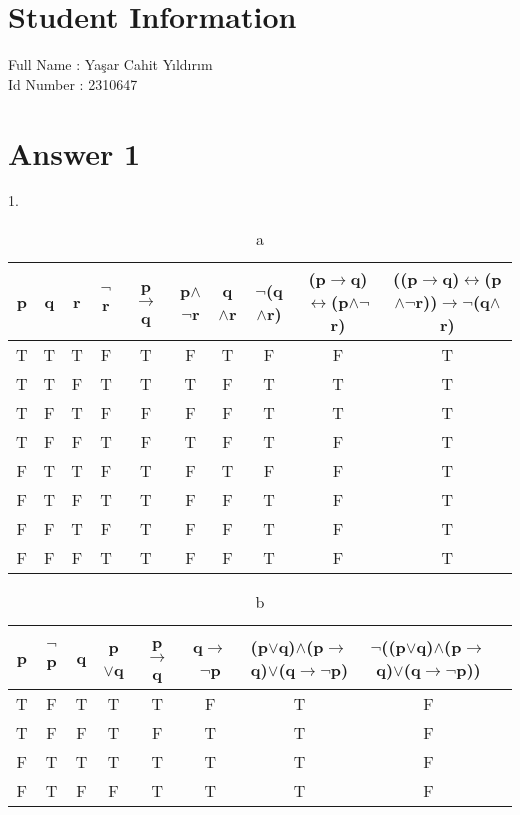 \documentclass[12pt]{article}
\begin{document}
\section*{Student Information } 
Full Name : Yaşar Cahit Yıldırım \\
Id Number : 2310647

\section*{Answer 1}
1.
\begin{table}[H]
\small
\centering
\caption{ a }
\label{table:1a}
\begin{tabular}{|c|c|c|c|c|c|c|c|c|c|}	%
\hline 							%
\textbf{p} & \textbf{q} & \textbf{r} & \textbf{$\neg$r} & \textbf{p$\rightarrow$q} & \textbf{p$\land$$\neg$r} & \textbf{q$\land$r} & \textbf{$\neg$(q$\land$r)} & \textbf{(p$\rightarrow$q)$\leftrightarrow$(p$\land$$\neg$r)} & \textbf{((p$\rightarrow$q)$\leftrightarrow$(p$\land$$\neg$r))$\rightarrow$$\neg$(q$\land$r)} \\
\hline 

\hline 
T & T & T & F & T & F & T & F & F & T \\
T & T & F & T & T & T & F & T & T & T \\
T & F & T & F & F & F & F & T & T & T \\
T & F & F & T & F & T & F & T & F & T \\
F & T & T & F & T & F & T & F & F & T \\
F & T & F & T & T & F & F & T & F & T \\
F & F & T & F & T & F & F & T & F & T \\
F & F & F & T & T & F & F & T & F & T \\
\hline 

\end{tabular}
\end{table}
\begin{table}[H]
\small
\centering
\caption{ b }
\label{table:1b}
\begin{tabular}{|c|c|c|c|c|c|c|c|c|}	%
\hline 							%
\textbf{p} & \textbf{$\neg$p} & \textbf{q} & \textbf{p$\lor$q} & \textbf{p$\rightarrow$q} & \textbf{q$\rightarrow$$\neg$p} & \textbf
{(p$\lor$q)$\land$(p$\rightarrow$q)$\lor$(q$\rightarrow$$\neg$p)} & \textbf
{$\neg$((p$\lor$q)$\land$(p$\rightarrow$q)$\lor$(q$\rightarrow$$\neg$p))} \\
\hline 

\hline 
T & F & T & T & T & F & T & F \\
T & F & F & T & F & T & T & F \\
F & T & T & T & T & T & T & F \\
F & T & F & F & T & T & T & F \\
\hline 

\end{tabular}
\end{table}
\end{document}
